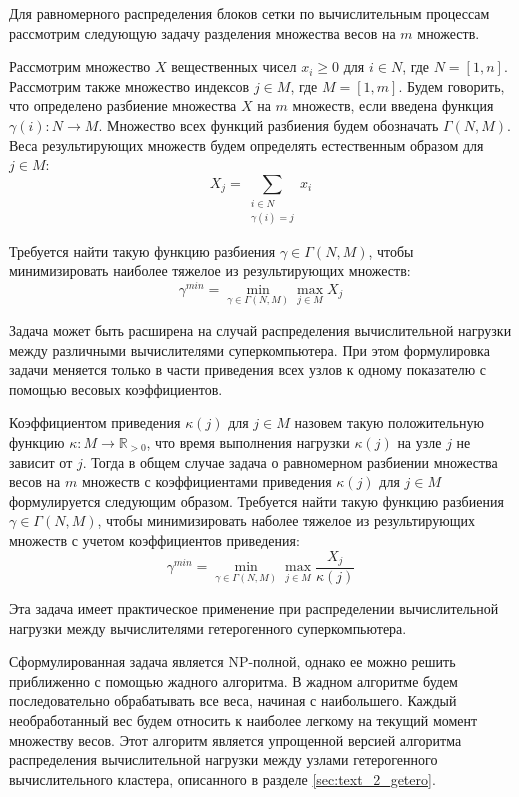 Для равномерного распределения блоков сетки по вычислительным процессам рассмотрим следующую задачу разделения множества весов на $m$ множеств.

Рассмотрим множество $X$ вещественных чисел $x_i \ge 0$ для $i \in N$, где $N = [1, n]$.
Рассмотрим также множество индексов $j \in M$, где $M = [1, m]$.
Будем говорить, что определено разбиение множества $X$ на $m$ множеств, если введена функция $\gamma(i): N \rightarrow M$.
Множество всех функций разбиения будем обозначать $\Gamma(N, M)$.
Веса результирующих множеств будем определять естественным образом для $j \in M$:
\begin{equation}
	X_j = \sum_{\substack{i \in N \\ \gamma(i) = j}}{x_i}
\end{equation}

Требуется найти такую функцию разбиения $\gamma \in \Gamma(N, M)$, чтобы минимизировать наиболее тяжелое из результирующих множеств:
\begin{equation}
	\gamma^{min} = \min_{\gamma \in \Gamma(N, M)}{\max_{j \in M}{X_j}}
\end{equation}

Задача может быть расширена на случай распределения вычислительной нагрузки между различными вычислителями суперкомпьютера. При этом формулировка задачи меняется только в части приведения всех узлов к одному показателю с помощью весовых коэффициентов.

Коэффициентом приведения $\kappa(j)$ для $j \in M$ назовем такую положительную функцию $\kappa: M \rightarrow \mathbb{R}_{>0}$, что время выполнения нагрузки $\kappa(j)$ на узле $j$ не зависит от $j$.
Тогда в общем случае задача о равномерном разбиении множества весов на $m$ множеств с коэффициентами приведения $\kappa(j)$ для $j \in M$ формулируется следующим образом.
Требуется найти такую функцию разбиения $\gamma \in \Gamma(N, M)$, чтобы минимизировать наболее тяжелое из результирующих множеств с учетом коэффициентов приведения:
\begin{equation}
	\gamma^{min} = \min_{\gamma \in \Gamma(N, M)}{\max_{j \in M}{ \frac{X_j}{\kappa(j)} }}
\end{equation}

Эта задача имеет практическое применение при распределении вычислительной нагрузки между вычислителями гетерогенного суперкомпьютера.

Сформулированная задача является NP-полной, однако ее можно решить приближенно с помощью жадного алгоритма.
В жадном алгоритме будем последовательно обрабатывать все веса, начиная с наибольшего.
Каждый необработанный вес будем относить к наиболее легкому на текущий момент множеству весов.
Этот алгоритм является упрощенной версией алгоритма распределения вычислительной нагрузки между узлами гетерогенного вычислительного кластера, описанного в разделе \ref{sec:text_2_getero}.

